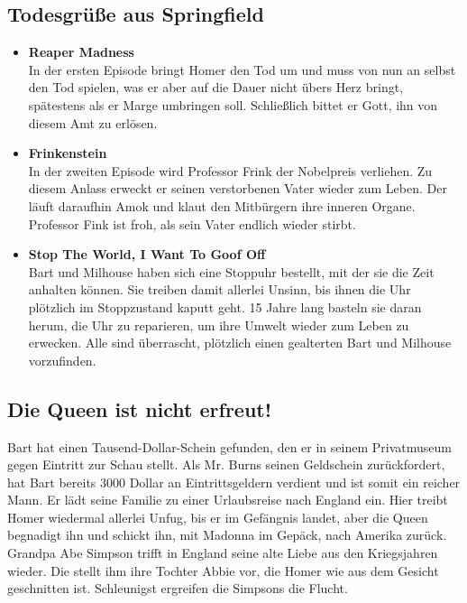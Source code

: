 \subsection{Todesgrüße aus Springfield}
\begin{itemize}
	\item \textbf{Reaper Madness}\\ In der ersten Episode bringt Homer den Tod um und muss von nun an selbst den Tod spielen, was er aber auf die Dauer nicht übers Herz bringt, spätestens als er Marge umbringen soll. Schließlich bittet er Gott, ihn von diesem Amt zu erlösen. 
	\item \textbf{Frinkenstein}\\ In der zweiten Episode wird Professor Frink der Nobelpreis verliehen. Zu diesem Anlass erweckt er seinen verstorbenen Vater wieder zum Leben. Der läuft daraufhin Amok und klaut den Mitbürgern ihre inneren Organe. Professor Fink ist froh, als sein Vater endlich wieder stirbt.    
	\item \textbf{Stop The World, I Want To Goof Off}\\ Bart und Milhouse haben sich eine Stoppuhr bestellt, mit der sie die Zeit anhalten können. Sie treiben damit allerlei Unsinn, bis ihnen die Uhr plötzlich im Stoppzustand kaputt geht. 15 Jahre lang basteln sie daran herum, die Uhr zu reparieren, um ihre Umwelt wieder zum Leben zu erwecken. Alle sind überrascht, plötzlich einen gealterten Bart und Milhouse vorzufinden.
\end{itemize}



	
\subsection{Die Queen ist nicht erfreut!}\label{EABF22}
Bart hat einen Tausend-Dollar-Schein gefunden, den er in seinem Privatmuseum gegen Eintritt zur Schau stellt. Als Mr. Burns seinen Geldschein zurückfordert, hat Bart bereits 3000 Dollar an Eintrittsgeldern verdient und ist somit ein reicher Mann. Er lädt seine Familie zu einer Urlaubsreise nach England ein. Hier treibt Homer wiedermal allerlei Unfug, bis er im Gefängnis landet, aber die Queen begnadigt ihn und schickt ihn, mit Madonna im Gepäck, nach Amerika zurück. Grandpa Abe Simpson trifft in England seine alte Liebe aus den Kriegsjahren wieder. Die stellt ihm ihre Tochter Abbie vor, die Homer wie aus dem Gesicht geschnitten ist. Schleunigst ergreifen die Simpsons die Flucht.

